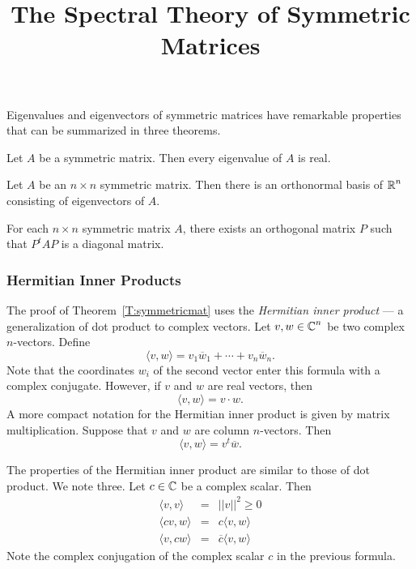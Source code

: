 \documentclass{ximera}
\title{The Spectral Theory of Symmetric Matrices}
\begin{document}
\begin{abstract}
\end{abstract}
\maketitle


\label{S:symmetric}

Eigenvalues and eigenvectors of symmetric matrices have remarkable properties that can be
summarized in three theorems.

\begin{theorem}  \label{T:symmetricmat}
Let $A$ be a symmetric matrix.
Then every eigenvalue of $A$ is real.
\end{theorem}

\begin{theorem}  \label{T:symmetricmatvector}
Let $A$ be an $n\times n$ symmetric matrix.
Then there is an orthonormal basis
of $\mbox{$\Bbb{R}$}^n$ consisting of eigenvectors of $A$.
\end{theorem}

\begin{theorem}  \label{T:symmetricmatdiag}
For each $n\times n$ symmetric matrix $A$, there exists an
orthogonal matrix $P$ such that $P^tAP$ is a diagonal matrix.
\end{theorem}

\subsubsection*{Hermitian Inner Products}

The proof of Theorem~\ref{T:symmetricmat} uses the {\em Hermitian inner
product} --- a generalization of
dot product to complex vectors.
Let $v,w\in\mbox{$\Bbb{C}$}^n$ be two complex $n$-vectors.  Define
\[
\langle v,w \rangle = v_1\overline{w}_1 + \cdots + v_n\overline{w}_n.
\]
Note that the coordinates $w_i$ of the second vector enter this formula
with a complex conjugate.  However, if $v$ and $w$ are real vectors, then
\[
\langle v,w \rangle = v\cdot w.
\]
A more compact notation for the Hermitian inner product is given by
matrix multiplication.
Suppose that $v$ and $w$ are column $n$-vectors.
Then
\[
\langle v,w \rangle = v^t\overline{w}.
\]

The properties of the Hermitian inner product are similar to those of dot
product.  We note three.  Let $c\in\mbox{$\Bbb{C}$}$ be a complex scalar.  Then
\begin{eqnarray*}
\langle v,v \rangle & = & ||v||^2\ge 0\\
\langle cv,w \rangle & = & c\langle v,w \rangle \\
\langle v,cw \rangle & = & \overline{c} \langle v,w \rangle
\end{eqnarray*}
Note the complex conjugation of the complex scalar $c$ in the previous
formula.
\end{document}

